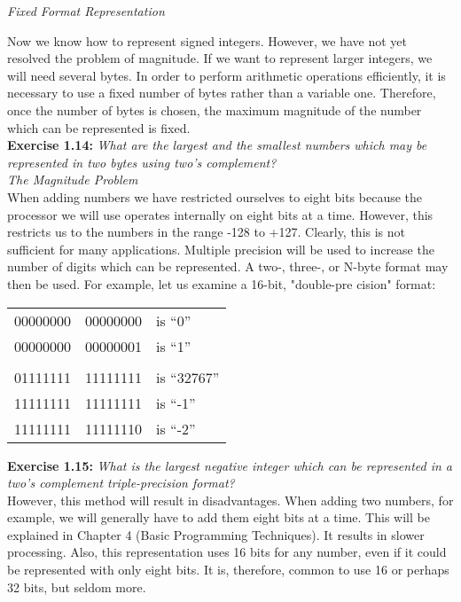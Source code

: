 \documentclass[12pt]{book}
\begin{document}
\noindent\textit{Fixed Format Representation}\

Now we know how to represent signed integers. However, we have not yet resolved the problem of magnitude. If we want to represent larger integers, we will need several bytes. In order to perform arithmetic operations efficiently, it is necessary to use a fixed number of bytes rather than a variable one. Therefore, once the number of bytes is chosen, the maximum magnitude of the number which can be represented is fixed.\\

\noindent\textbf{Exercise 1.14:} \textit{What are the largest and the smallest numbers which may be represented in two bytes using two's complement?}\\

\noindent\textit{The Magnitude Problem}\\

When adding numbers we have restricted ourselves to eight bits because the processor we will use operates internally on eight bits at a time. However, this restricts us to the numbers in the range -128 to +127. Clearly, this is not sufficient for many applications. Multiple precision will be used to increase the number of digits which can be represented. A two-, three-, or N-byte format may then be used. For example, let us examine a 16-bit, "double-pre cision" format:
\begin{table}[H]\begin{center}
\begin{tabular}{rrl}
00000000 & 00000000 & is “0”     \\
00000000 & 00000001 & is “1”     \\
         &          &            \\
01111111 & 11111111 & is “32767” \\
11111111 & 11111111 & is “-1”    \\
11111111 & 11111110 & is “-2”   
\end{tabular}\end{center}
\end{table}
\noindent\textbf{Exercise 1.15:} \textit{What is the largest negative integer which can be represented in a two's complement triple-precision format?}\\

However, this method will result in disadvantages. When adding two numbers, for example, we will generally have to add them eight bits at a time. This will be explained in Chapter 4 (Basic Programming Techniques). It results in slower processing. Also, this representation uses 16 bits for any number, even if it could be represented with only eight bits. It is, therefore, common to use 16 or perhaps 32 bits, but seldom more.
\end{document}
